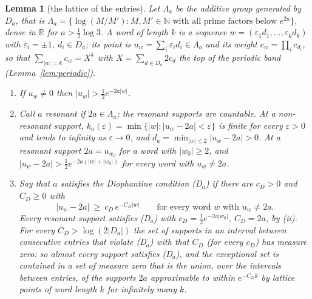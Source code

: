 \documentclass[11pt]{article}
\newtheorem{lemma}[theorem]{Lemma}
\theoremstyle{definition}
\theoremstyle{remark}
\newcommand{\N}{\mathbb{N}}
\newcommand{\R}{\mathbb{R}}
\begin{document}
\begin{lemma}[the lattice of the entries]\label{lem:dioph}
Let $\Lambda_a$ be the additive group generated by $D_a$, that is $\Lambda_a=\{\log(M/M'):M,M'\in\N\text{ with all prime factors below }e^{2a}\}$, dense in $\R$ for $a>\tfrac12\log3$. A \emph{word} of length $k$ is a sequence $w=(\varepsilon_1d_1,\dots,\varepsilon_kd_k)$ with $\varepsilon_i=\pm1$, $d_i\in D_a$; its point is $u_w=\sum_i\varepsilon_id_i\in\Lambda_a$ and its weight $c_w=\prod_ic_{d_i}$, so that $\sum_{|w|=k}c_w=X^k$ with $X=\sum_{d\in D_a}2c_d$ the top of the periodic band (Lemma~\ref{lem:periodic}).
\begin{enumerate}
\item[(i)] If $u_w\ne0$ then $|u_w|>\tfrac12e^{-2a|w|}$.
\item[(ii)] Call $a$ \emph{resonant} if $2a\in\Lambda_a$; the resonant supports are countable. At a non-resonant support, $k_a(\varepsilon)=\min\{|w|:|u_w-2a|<\varepsilon\}$ is finite for every $\varepsilon>0$ and tends to infinity as $\varepsilon\to0$, and $d_a=\min_{|w|\le2}|u_w-2a|>0$. At a resonant support $2a=u_{w_0}$ for a word with $|w_0|\ge2$, and $|u_w-2a|>\tfrac12e^{-2a(|w|+|w_0|)}$ for every word with $u_w\ne2a$.
\item[(iii)] Say that $a$ satisfies the \emph{Diophantine condition} (D$_a$) if there are $c_D>0$ and $C_D\ge0$ with
\[
|u_w-2a|\ \ge\ c_D\,e^{-C_D|w|}\qquad\text{for every word $w$ with }u_w\ne2a .
\]
Every resonant support satisfies (D$_a$) with $c_D=\tfrac12e^{-2a|w_0|}$, $C_D=2a$, by (ii). For every $C_D>\log(2|D_a|)$ the set of supports in an interval between consecutive entries that violate (D$_a$) with that $C_D$ (for every $c_D$) has measure zero: so almost every support satisfies (D$_a$), and the exceptional set is contained in a set of measure zero that is the union, over the intervals between entries, of the supports $2a$ approximable to within $e^{-C_D k}$ by lattice points of word length $k$ for infinitely many $k$.
\end{enumerate}
\end{lemma}
\end{document}

